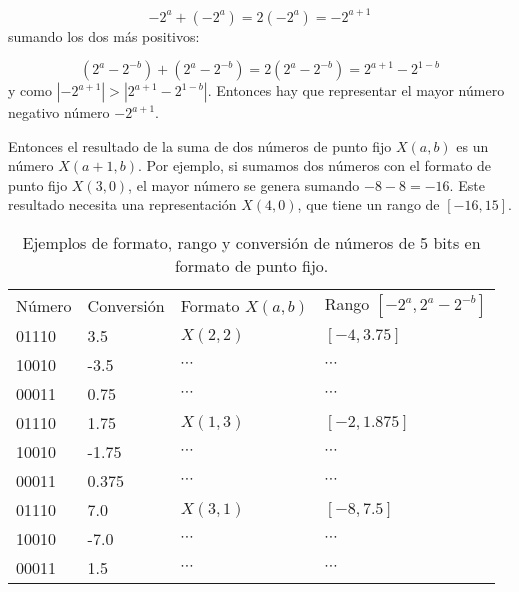         \begin{equation}
            -2^{a} + (-2^{a}) = 2 (-2^{a}) = -2^{a+1}
            \label{eq:}
        \end{equation}
        sumando los dos más positivos:

        \begin{equation}
            (2^{a} - 2^{-b}) + (2^{a} - 2^{-b}) = 2 (2^{a} - 2^{-b}) = 2^{a+1} - 2^{1-b}            
            \label{eq:}
        \end{equation}
        y como $|-2^{a+1}| > |2^{a+1} - 2^{1-b}|$. Entonces hay que representar el mayor número negativo número $-2^{a+1}$.

        Entonces el resultado de la suma de dos números de punto fijo $X(a,b)$ es un número $X(a+1,b)$. Por ejemplo, si sumamos dos números con el formato de punto fijo $X(3,0)$, el mayor número se genera sumando $-8-8 = -16$. Este resultado necesita una representación $X(4,0)$, que tiene un rango de $[-16,15]$.

        \begin{table}[htbp]
            \centering
            \caption{Ejemplos de formato, rango y conversión de números de 5 bits en formato de punto fijo.}
            \begin{tabular}{|l|l|l|l|}
                \hline
                \rowcolor{lightgray}   Número & Conversión & Formato $X(a,b)$  & Rango $[-2^{a}, 2^{a} - 2^{-b}]$\\
                01110 & 3.5 & $X(2,2)$ & $[-4,3.75]$ \\ 
                \hline
                10010 & -3.5 & $\cdots$ & $\cdots$\\ 
                \hline
                00011 & 0.75 & $\cdots$ & $\cdots$\\ 
                \hline
                01110 & 1.75 & $X(1,3)$ & $[-2,1.875]$ \\ 
                \hline
                10010 & -1.75 & $\cdots$ & $\cdots$\\ 
                \hline
                00011 & 0.375 & $\cdots$ & $\cdots$\\ 
                \hline
                01110 & 7.0 & $X(3,1)$ & $[-8,7.5]$ \\ 
                \hline
                10010 & -7.0 & $\cdots$ & $\cdots$\\ 
                \hline
                00011 & 1.5 & $\cdots$ & $\cdots$\\ 
                \hline
            \end{tabular}
            \label{tab:ejemplos_puntofijo}
        \end{table}

